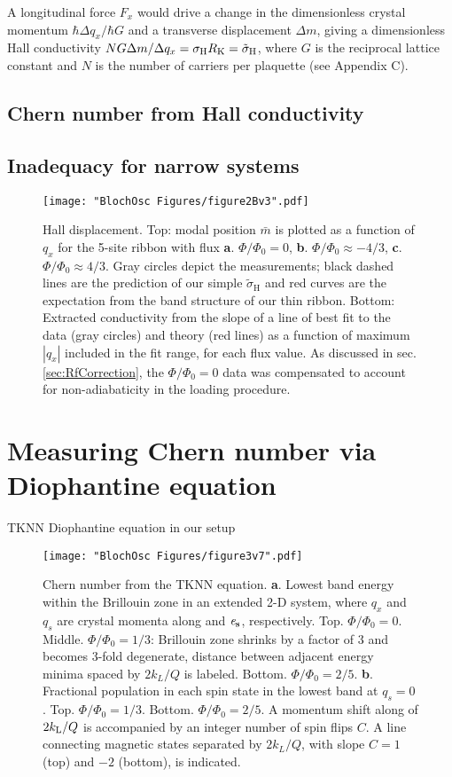 A longitudinal force $F_x$ would drive a change in the dimensionless crystal momentum $\hbar\Delta q_x/\hbar G$  and a transverse displacement $\Delta m$, giving a dimensionless Hall conductivity  $N G\Delta m/ \Delta q_x=\sigma_{\rm{H}} R_{\rm{K}}={\tilde\sigma}_{\rm{H}}$, where $G$ is the reciprocal lattice constant and $N$ is the number of carriers per plaquette (see Appendix C). 


\subsection{Chern number from Hall conductivity}

\subsection{Inadequacy for narrow systems}


\begin{figure}
\texttt{[image: "BlochOsc Figures/figure2Bv3".pdf]}
\caption{Hall displacement. Top: modal position $\bar{m}$ is plotted as a function of $q_x$ for the 5-site ribbon with flux \textbf{a}. $\Phi/\Phi_0=0$, \textbf{b}. $\Phi/\Phi_0\approx-4/3$, \textbf{c}. $\Phi/\Phi_0\approx4/3$. Gray circles depict the measurements; black dashed lines are the prediction of our simple $\tilde{\sigma}_\textrm{H}$ and red curves are the expectation from the band structure of our thin ribbon. Bottom: Extracted conductivity from the slope of a line of best fit to the data (gray circles) and theory (red lines) as a function of maximum $|q_x|$ included in the fit range, for each flux value. As discussed in sec. \ref{sec:RfCorrection}, the $\Phi/\Phi_0=0$ data was compensated to account for non-adiabaticity in the loading procedure. }
\label{fig:magnetization}
\end{figure}

\section{Measuring Chern number via Diophantine equation}
	TKNN Diophantine equation in our setup

\begin{figure}
\texttt{[image: "BlochOsc Figures/figure3v7".pdf]}
\caption{Chern number from the TKNN equation.  \textbf{a}. Lowest band energy within the Brillouin zone in an extended 2-D system, where $q_x$ and $q_s$ are crystal momenta along \ex and $\bf{\mathit{e}_s}$, respectively. Top. $\Phi/\Phi_0=0$. Middle. $\Phi/\Phi_0=1/3$: Brillouin zone shrinks by a factor of $3$ and becomes 3-fold degenerate, distance between adjacent energy minima spaced by $2k_L/Q$ is labeled. Bottom. $\Phi/\Phi_0=2/5$. \textbf{b}.  Fractional population in each spin state in the lowest band at $q_s=0$. Top. $\Phi/\Phi_0=1/3$. Bottom. $\Phi/\Phi_0=2/5$. A momentum shift along \ex of $2k_{\rm{L}}/Q$ is accompanied by an integer number of spin flips $C$. A line connecting magnetic states separated by $2k_L/Q$, with slope $C=1$ (top) and $-2$ (bottom), is indicated. }
\label{fig:Diophantine}
\end{figure}


